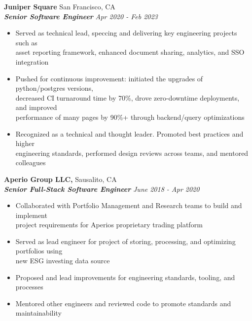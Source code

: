\documentclass[]{resume}
\newcommand\tab[1][.5cm]{\hspace*{#1}}
\begin{document}
\begin{resume}
\vspace{0.9mm}
\textbf{\large Juniper Square} {\large San Francisco, CA}\\
\tab \textbf{\textit{Senior Software Engineer}} \hfill \textit{Apr 2020 - Feb 2023}
\begin{itemize}
    \item
    Served as technical lead, speccing and delivering key engineering projects such as \\
    asset reporting framework, enhanced document sharing, analytics, and SSO integration
    \item
    Pushed for continuous improvement: initiated the upgrades of python/postgres versions,\\
     decreased CI turnaround time by 70\%, drove zero-downtime deployments, and improved \\
     performance of many pages by 90\%+ through backend/query optimizations
    \item
    Recognized as a technical and thought leader. Promoted best practices and higher \\
    engineering standards, performed design reviews across teams, and mentored colleagues
\end{itemize}

\vspace{0.9mm}
\textbf{\large Aperio Group LLC,} {\large Sausalito, CA}\\
\tab \textbf{\textit{Senior Full-Stack Software Engineer}} \hfill \textit{June 2018 - Apr 2020}
\begin{itemize}
    \item
    Collaborated with Portfolio Management and Research teams to build and implement \\
    project requirements for Aperio\textsc{}s proprietary trading platform
    \item
    Served as lead engineer for project of storing, processing, and optimizing portfolios using \\
    new ESG investing data source
    \item
    Proposed and lead improvements for engineering standards, tooling, and processes
    \item
    Mentored other engineers and reviewed code to promote standards and maintainability
\end{itemize}


\end{resume}
\end{document}
